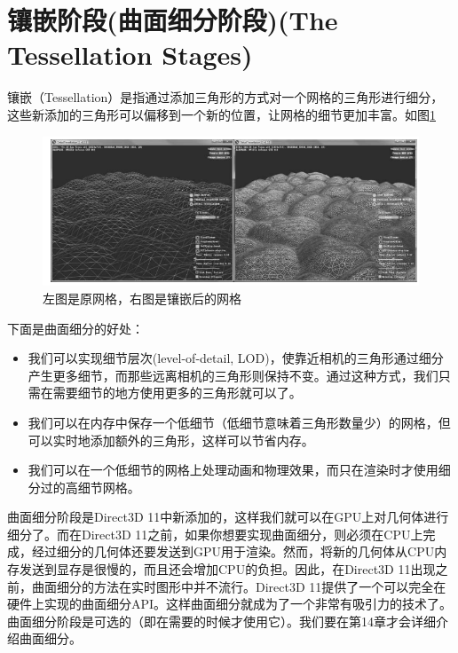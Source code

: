 \documentclass[11pt,a4paper,oldfontcommands]{memoir}
\begin{document}
{\section{镶嵌阶段(曲面细分阶段)(The Tessellation Stages)}
\begin{flushleft}
镶嵌（Tessellation）是指通过添加三角形的方式对一个网格的三角形进行细分，这些新添加的三角形可以偏移到一个新的位置，让网格的细节更加丰富。如图\ref{fig:5-26}
\end{flushleft}
\begin{figure}[h]
    \includegraphics[width=\textwidth]{5-26}
    \centering
    \caption{左图是原网格，右图是镶嵌后的网格}
    \label{fig:5-26}
\end{figure}

\begin{flushleft}
下面是曲面细分的好处：
\begin{itemize}
    \item 我们可以实现细节层次(level-of-detail, LOD)，使靠近相机的三角形通过细分产生更多细节，而那些远离相机的三角形则保持不变。通过这种方式，我们只需在需要细节的地方使用更多的三角形就可以了。
    \item 我们可以在内存中保存一个低细节（低细节意味着三角形数量少）的网格，但可以实时地添加额外的三角形，这样可以节省内存。
    \item 我们可以在一个低细节的网格上处理动画和物理效果，而只在渲染时才使用细分过的高细节网格。
\end{itemize}
曲面细分阶段是Direct3D 11中新添加的，这样我们就可以在GPU上对几何体进行细分了。而在Direct3D 11之前，如果你想要实现曲面细分，则必须在CPU上完成，经过细分的几何体还要发送到GPU用于渲染。然而，将新的几何体从CPU内存发送到显存是很慢的，而且还会增加CPU的负担。因此，在Direct3D 11出现之前，曲面细分的方法在实时图形中并不流行。Direct3D 11提供了一个可以完全在硬件上实现的曲面细分API。这样曲面细分就成为了一个非常有吸引力的技术了。曲面细分阶段是可选的（即在需要的时候才使用它）。我们要在第14章才会详细介绍曲面细分。
\end{flushleft}

}
\end{document}
